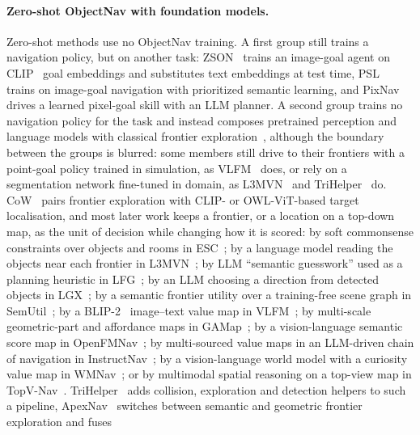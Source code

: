 \documentclass[10pt]{article}
\begin{document}
\paragraph{Zero-shot ObjectNav with foundation models.}
Zero-shot methods use no ObjectNav training. A first group still trains a navigation policy, but on
another task: ZSON~\citep{majumdar2022zson} trains an image-goal agent on CLIP~\citep{radford2021learning}
goal embeddings and substitutes text embeddings at test time, PSL~\citep{sun2024prioritized} trains on
image-goal navigation with prioritized semantic learning, and PixNav~\citep{cai2024bridging} drives a
learned pixel-goal skill with an LLM planner. A second group trains no navigation policy for the task and
instead composes pretrained perception and language models with classical frontier
exploration~\citep{yamauchi1997frontier}, although the boundary between the groups is blurred: some
members still drive to their frontiers with a point-goal policy trained in simulation, as
VLFM~\citep{yokoyama2024vlfm} does, or rely on a segmentation network fine-tuned in domain, as
L3MVN~\citep{yu2023l3mvn} and TriHelper~\citep{zhang2024trihelper} do. CoW~\citep{gadre2023cows} pairs
frontier exploration with CLIP- or OWL-ViT-based target localisation, and most later work keeps a
frontier, or a location on a top-down map, as the unit of decision while changing how it is scored: by
soft commonsense constraints over objects and rooms in ESC~\citep{zhou2023esc}; by a language model reading the objects near each frontier
in L3MVN~\citep{yu2023l3mvn}; by LLM ``semantic guesswork'' used as a planning heuristic in
LFG~\citep{shah2023navigation}; by an LLM choosing a direction from detected objects in
LGX~\citep{dorbala2024can}; by a semantic frontier utility over a training-free scene graph in
SemUtil~\citep{chen2023how}; by a BLIP-2~\citep{li2023blip} image--text value map in
VLFM~\citep{yokoyama2024vlfm}; by multi-scale geometric-part and affordance maps in
GAMap~\citep{yuan2024gamap}; by a vision-language semantic score map in OpenFMNav~\citep{kuang2024openfmnav};
by multi-sourced value maps in an LLM-driven chain of navigation in InstructNav~\citep{long2024instructnav};
by a vision-language world model with a curiosity value map in WMNav~\citep{nie2025wmnav}; or by
multimodal spatial reasoning on a top-view map in TopV-Nav~\citep{zhong2024topvnav}.
TriHelper~\citep{zhang2024trihelper} adds collision, exploration and detection helpers to such a pipeline,
ApexNav~\citep{zhang2025apexnav} switches between semantic and geometric frontier exploration and fuses
\end{document}
